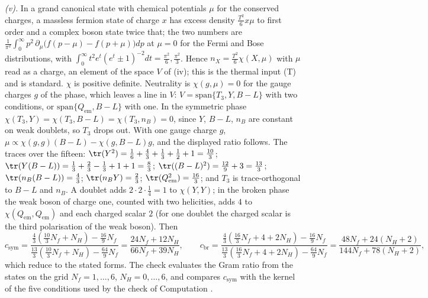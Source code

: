 \emph{(v).} In a grand canonical state with chemical potentials $\mu$ for the conserved charges, a massless fermion state of charge $x$ has excess density $\tfrac{T^{2}}{6}x\mu$ to first order and a complex boson state twice that; the two numbers are $\tfrac{1}{\pi^{2}}\int_{0}^{\infty}p^{2}\,\partial_{\mu}\bigl(f(p - \mu) - f(p + \mu)\bigr)dp$ at $\mu = 0$ for the Fermi and Bose distributions, with $\int_{0}^{\infty}t^{2}e^{t}(e^{t} \pm 1)^{-2}dt = \tfrac{\pi^{2}}{6}, \tfrac{\pi^{2}}{3}$. Hence $n_{X} = \tfrac{T^{2}}{6}\chi(X, \mu)$ with $\mu$ read as a charge, an element of the space $V$ of (iv); this is the thermal input (T) and is standard. $\chi$ is positive definite. Neutrality is $\chi(g, \mu) = 0$ for the gauge charges $g$ of the phase, which leaves a line in $V$: $V = \mathrm{span}\{T_{3}, Y, B - L\}$ with two conditions, or $\mathrm{span}\{Q_{\mathrm{em}}, B - L\}$ with one. In the symmetric phase $\chi(T_{3}, Y) = \chi(T_{3}, B - L) = \chi(T_{3}, n_{B}) = 0$, since $Y$, $B - L$, $n_{B}$ are constant on weak doublets, so $T_{3}$ drops out. With one gauge charge $g$, $\mu \propto \chi(g, g)(B - L) - \chi(g, B - L)g$, and the displayed ratio follows. The traces over the fifteen: $\tr(Y^{2}) = \tfrac16 + \tfrac43 + \tfrac13 + \tfrac12 + 1 = \tfrac{10}{3}$; $\tr(Y(B - L)) = \tfrac13 + \tfrac23 - \tfrac13 + 1 + 1 = \tfrac83$; $\tr((B - L)^{2}) = \tfrac{12}{9} + 3 = \tfrac{13}{3}$; $\tr(n_{B}(B - L)) = \tfrac43$; $\tr(n_{B}Y) = \tfrac23$; $\tr(Q_{\mathrm{em}}^{2}) = \tfrac{16}{3}$; and $T_{3}$ is trace-orthogonal to $B - L$ and $n_{B}$. A doublet adds $2 \cdot 2 \cdot \tfrac14 = 1$ to $\chi(Y, Y)$; in the broken phase the weak boson of charge one, counted with two helicities, adds $4$ to $\chi(Q_{\mathrm{em}}, Q_{\mathrm{em}})$ and each charged scalar $2$ (for one doublet the charged scalar is the third polarisation of the weak boson). Then
\[
c_{\mathrm{sym}} = \frac{\tfrac43(\tfrac{10}{3}N_{f} + N_{H}) - \tfrac{16}{9}N_{f}}{\tfrac{13}{3}(\tfrac{10}{3}N_{f} + N_{H}) - \tfrac{64}{9}N_{f}} = \frac{24N_{f} + 12N_{H}}{66N_{f} + 39N_{H}}, \qquad c_{\mathrm{br}} = \frac{\tfrac43(\tfrac{16}{3}N_{f} + 4 + 2N_{H}) - \tfrac{16}{9}N_{f}}{\tfrac{13}{3}(\tfrac{16}{3}N_{f} + 4 + 2N_{H}) - \tfrac{64}{9}N_{f}} = \frac{48N_{f} + 24(N_{H} + 2)}{144N_{f} + 78(N_{H} + 2)},
\]
which reduce to the stated forms. The check evaluates the Gram ratio from the states on the grid $N_{f} = 1, \dots, 6$, $N_{H} = 0, \dots, 6$, and compares $c_{\mathrm{sym}}$ with the kernel of the five conditions used by the check of Computation .

